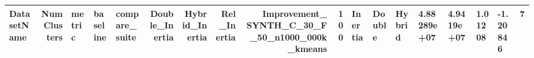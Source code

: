 \begin{tabular}{lrlllrrrrr}
\toprule
DatasetName & NumClusters & metric & baseline & compare_suite & Double_Inertia & Hybrid_Inertia & Rel_Inertia & Improvement_%
\midrule
SYNTH_C_30_F_50_n1000_000k_kmeans & 100 & Inertia & Double & Hybrid & 4.88289e+07 & 4.9419e+07 & 1.01208 & -1.20846 & 7 \\
\bottomrule
\end{tabular}
